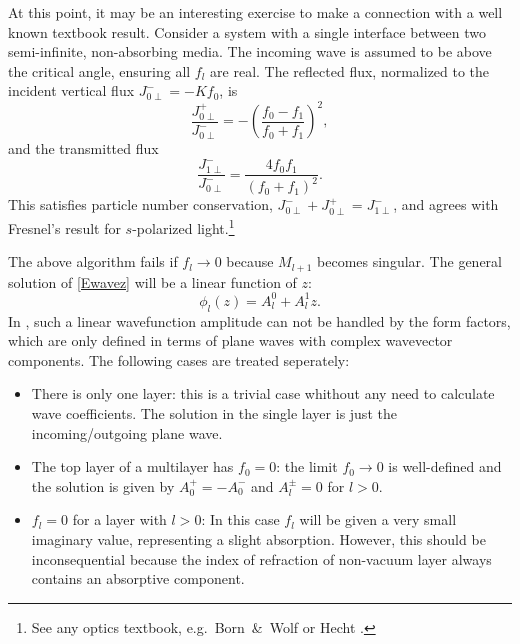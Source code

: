 At this point,
it may be an interesting exercise to make
 a connection with a well known textbook result.
Consider a system
with a single interface between two semi-infinite,
non-absorbing media. The incoming wave is assumed to be above the
critical angle, ensuring all $f_l$ are real.
The reflected flux,
normalized to the incident vertical flux $J_{0\perp}^-=-Kf_0$, is
%
\begin{equation}\label{EJrefl}
  \frac{J_{0\perp}^+}{J_{0\perp}^-}
  = - \left(\frac{f_0-f_1}{f_0+f_1}\right)^2,
\end{equation}
and the transmitted flux
%
\begin{equation}\label{EJtran}
  \frac{J_{1\perp}^-}{J_{0\perp}^-}
  = \frac{4f_0 f_1}{(f_0+f_1)^2}.
\end{equation}
This satisfies particle number conservation, $J_{0\perp}^-+J_{0\perp}^+=J_{1\perp}^-$,
and agrees with Fresnel's result for $s$-polarized light.\footnote
{See any optics textbook, e.g.\ Born~\&~Wolf \cite[ch.~1.5.2]{BoWo99}
  or Hecht \cite[ch.~4.6.2]{Hec02}.}

The above algorithm fails if $f_l\to0$
because $M_{l+1}$ becomes singular.
The general solution of \cref{Ewavez} will be a linear function of $z$:
\begin{equation}\label{Ephilz}
  \phi_l(z) = A^0_l + A^1_lz.
\end{equation}
In \BornAgain, such a linear wavefunction amplitude can not be handled by the form factors,
which are only defined in terms of plane waves with complex wavevector components.
The following cases are treated seperately:
\begin{itemize}
  \item There is only one layer: this is a trivial case whithout any need to calculate wave coefficients.
    The solution in the single layer is just the incoming/outgoing plane wave.
  \item The top layer of a multilayer has $f_0=0$: the limit $f_0\to0$ is well-defined and the
    solution is given by $A^+_0 = -A^-_0$ and $A^{\pm}_l=0$ for $l>0$.
  \item $f_l=0$ for a layer with $l>0$: In this case $f_l$ will be given a very small imaginary value,
    representing a slight absorption. However, this should be inconsequential because the index of refraction
    of non-vacuum layer always contains an absorptive component.
\end{itemize}

